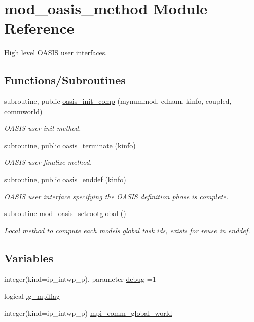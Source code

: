 \hypertarget{namespacemod__oasis__method}{}\section{mod\+\_\+oasis\+\_\+method Module Reference}
\label{namespacemod__oasis__method}


High level O\+A\+S\+IS user interfaces.  


\subsection*{Functions/\+Subroutines}
\begin{DoxyCompactItemize}
\item 
subroutine, public \hyperlink{namespacemod__oasis__method_ad266b77f6e75f2d150c80374a841a43c}{oasis\+\_\+init\+\_\+comp} (mynummod, cdnam, kinfo, coupled, commworld)
\begin{DoxyCompactList}\small\item\em O\+A\+S\+IS user init method. \end{DoxyCompactList}\item 
subroutine, public \hyperlink{namespacemod__oasis__method_a4fb881336906c9452b6a9f250af9c3d7}{oasis\+\_\+terminate} (kinfo)
\begin{DoxyCompactList}\small\item\em O\+A\+S\+IS user finalize method. \end{DoxyCompactList}\item 
subroutine, public \hyperlink{namespacemod__oasis__method_a093552f9f9895ac79a5fefa043fc5881}{oasis\+\_\+enddef} (kinfo)
\begin{DoxyCompactList}\small\item\em O\+A\+S\+IS user interface specifying the O\+A\+S\+IS definition phase is complete. \end{DoxyCompactList}\item 
subroutine \hyperlink{namespacemod__oasis__method_a13d6e469ea14642a2e1e6cb807d9b7de}{mod\+\_\+oasis\+\_\+setrootglobal} ()
\begin{DoxyCompactList}\small\item\em Local method to compute each models\textquotesingle{} global task ids, exists for reuse in enddef. \end{DoxyCompactList}\end{DoxyCompactItemize}
\subsection*{Variables}
\begin{DoxyCompactItemize}
\item 
integer(kind=ip\+\_\+intwp\+\_\+p), parameter \hyperlink{namespacemod__oasis__method_a390290b92b6af57b2732cb7521532f1c}{debug} =1
\item 
logical \hyperlink{namespacemod__oasis__method_a405af91a0535e4ce70d55513bb4c3867}{lg\+\_\+mpiflag}
\item 
integer(kind=ip\+\_\+intwp\+\_\+p) \hyperlink{namespacemod__oasis__method_aff65fa61d2762374419fe4c44c0f9282}{mpi\+\_\+comm\+\_\+global\+\_\+world}
\end{DoxyCompactItemize}


